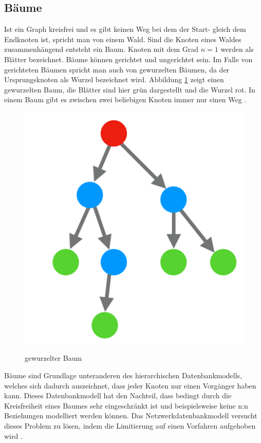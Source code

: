 \subsection{Bäume}
Ist ein Graph kreisfrei und es gibt keinen Weg bei dem der Start- gleich dem Endknoten ist, spricht man von einem Wald.
Sind die Knoten eines Waldes zusammenhängend entsteht ein Baum.
Knoten mit dem Grad $n=1$ werden als Blätter bezeichnet.
Bäume können gerichtet und ungerichtet sein.
Im Falle von gerichteten Bäumen spricht man auch von gewurzelten Bäumen, da der Ursprungsknoten als Wurzel bezeichnet wird.
Abbildung \ref{2.baum.image} zeigt einen gewurzelten Baum, die Blätter sind hier grün dargestellt und die Wurzel rot.
In einem Baum gibt es zwischen zwei beliebigen Knoten immer nur einen Weg \cite{basicgraphtheory}.
\begin{figure}[H]
	\begin{center}
	\includegraphics[scale = 0.3]{./images/baum.png}
	\label{2.baum.image}
    \caption{gewurzelter Baum}
	\end{center}
\end{figure}
Bäume sind Grundlage unteranderen des hierarchischen Datenbankmodells, welches sich dadurch auszeichnet, dass jeder Knoten nur einen Vorgänger haben kann.
Dieses Datenbankmodell hat den Nachteil, dass bedingt durch die Kreisfreiheit eines Baumes sehr eingeschränkt ist und beispielsweise keine n:n Beziehungen modelliert werden können.
Das Netzwerkdatenbankmodell versucht dieses Problem zu lösen, indem die Limitierung auf einen Vorfahren aufgehoben wird \cite{hald2013datenbank}.